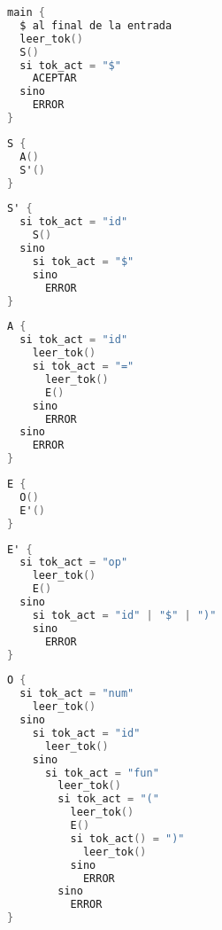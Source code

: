 \documentclass[12pt, twoside, openright]{report} %
\begin{document}
\begin{lstlisting}[language=C]
main {
  $ al final de la entrada
  leer_tok()
  S()
  si tok_act = "$"
    ACEPTAR
  sino
    ERROR
}
\end{lstlisting}
\begin{lstlisting}[language=C]
S {
  A()
  S'()
}
\end{lstlisting}
\begin{lstlisting}[language=C]
S' {
  si tok_act = "id"
    S()
  sino
    si tok_act = "$"
    sino
      ERROR 
}
\end{lstlisting}
\pagebreak
\begin{lstlisting}[language=C]
A {
  si tok_act = "id"
    leer_tok()
    si tok_act = "="
      leer_tok()
      E()
    sino
      ERROR
  sino
    ERROR
}
\end{lstlisting}
\begin{lstlisting}[language=C]
E {
  O()
  E'()
}
\end{lstlisting}
\begin{lstlisting}[language=C]
E' {
  si tok_act = "op"
    leer_tok()
    E()
  sino
    si tok_act = "id" | "$" | ")"
    sino
      ERROR
}
\end{lstlisting}
\begin{lstlisting}[language=C]
O {
  si tok_act = "num"
    leer_tok()
  sino
    si tok_act = "id"
      leer_tok()
    sino
      si tok_act = "fun"
        leer_tok()
        si tok_act = "("
          leer_tok()
          E()
          si tok_act() = ")"
            leer_tok()
          sino
            ERROR
        sino
          ERROR
}
\end{lstlisting}
\end{document}
